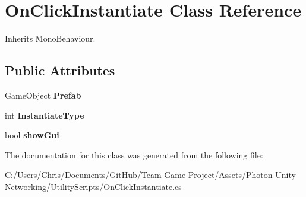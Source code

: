 \hypertarget{class_on_click_instantiate}{}\section{On\+Click\+Instantiate Class Reference}
\label{class_on_click_instantiate}


Inherits Mono\+Behaviour.

\subsection*{Public Attributes}
\begin{DoxyCompactItemize}
\item 
Game\+Object {\bfseries Prefab}\hypertarget{class_on_click_instantiate_a4aefd39959a96154a9f5a9249d38be90}{}\label{class_on_click_instantiate_a4aefd39959a96154a9f5a9249d38be90}

\item 
int {\bfseries Instantiate\+Type}\hypertarget{class_on_click_instantiate_a1e3b8dfd6e6222b1f1e5a951d38cc1b5}{}\label{class_on_click_instantiate_a1e3b8dfd6e6222b1f1e5a951d38cc1b5}

\item 
bool {\bfseries show\+Gui}\hypertarget{class_on_click_instantiate_ae42e02f90b1f85076f4c085521951fdf}{}\label{class_on_click_instantiate_ae42e02f90b1f85076f4c085521951fdf}

\end{DoxyCompactItemize}


The documentation for this class was generated from the following file\+:\begin{DoxyCompactItemize}
\item 
C\+:/\+Users/\+Chris/\+Documents/\+Git\+Hub/\+Team-\/\+Game-\/\+Project/\+Assets/\+Photon Unity Networking/\+Utility\+Scripts/On\+Click\+Instantiate.\+cs\end{DoxyCompactItemize}
